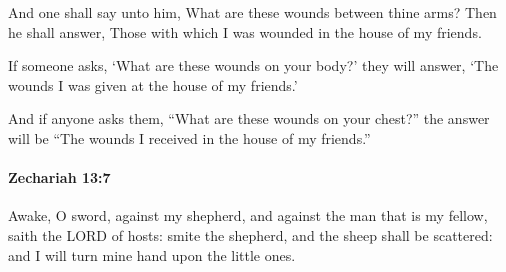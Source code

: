 			\begin{versebox}
					\item[BHS] 
					\item[LXX] 
					\item[ASV] And one shall say unto him, What are these wounds between thine arms? Then he shall answer, Those with which I was wounded in the house of my friends.
					\item[NIV] If someone asks, ‘What are these wounds on your body?’ they will answer, ‘The wounds I was given at the house of my friends.’
					\item[NRSV] And if anyone asks them, “What are these wounds on your chest?” the answer will be “The wounds I received in the house of my friends.”
			\end{versebox}

		\paragraph{Zechariah 13:7} %
			\label{ZECHARIAH-13-7}

			Awake, O sword, against my shepherd, and against the man that is my fellow, saith the LORD of hosts: smite the shepherd, and the sheep shall be scattered: and I will turn mine hand upon the little ones.

